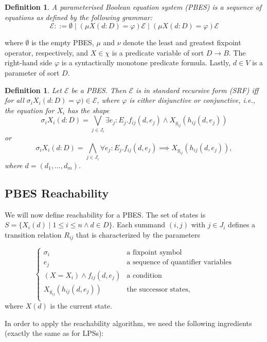 \documentclass{article}
\newtheorem{definition}[theorem]{Definition}
\begin{document}
\begin{definition}
A parameterised Boolean equation system (PBES) is a sequence of equations as defined by the following grammar:
\[
\mathcal{E} ::= \emptyset \mid (\mu X(d:D) = \varphi) \mathcal{E} \mid (\mu X(d:D) = \varphi) \mathcal{E}
\]
\end{definition}
where $\emptyset$ is the empty PBES, $\mu$ and $\nu$ denote the least and greatest fixpoint operator, respectively, and $X \in \chi$ is a predicate
variable of sort $D \rightarrow B$. The right-hand side $\varphi$ is a syntactically monotone predicate formula. Lastly, $d \in V$ is a parameter of
sort $D$.

\begin{definition}
Let $\mathcal{E}$ be a PBES. Then $\mathcal{E}$ is in standard recursive form (SRF) iff for all $\sigma_i X_i(d:D) = \varphi) \in \mathcal{E}$, where
$\varphi$ is either disjunctive or conjunctive, i.e., the equation for $X_i$ has the shape
\[
  \sigma_i X_i(d:D) = \bigvee\limits_{j \in J_i} \exists e_j: E_j . f_{ij}(d,e_j) \land X_{g_{ij}}(h_{ij}(d, e_j))
\]
or
\[
  \sigma_i X_i(d:D) = \bigwedge\limits_{j \in J_i} \forall e_j: E_j . f_{ij}(d,e_j) \implies X_{g_{ij}}(h_{ij}(d, e_j)),
\]
where $d = (d_1, \ldots, d_m)$.
\end{definition}

\subsection{PBES Reachability}
We will now define reachability for a PBES.
The set of states is $S = \{ X_i(d) \mid 1 \leq i \leq n \land d \in D \}$.
Each summand $(i,j)$ with $j \in J_i$ defines a transition relation $R_{ij}$ that is characterized by the parameters

\[
\left\{
\begin{array}{ll}
    \sigma_i & \text{a fixpoint symbol} \\
    e_j & \text{a sequence of quantifier variables} \\
    (X = X_i) \land f_{ij}(d,e_j) & \text{a condition} \\
    X_{g_{ij}}(h_{ij}(d, e_j)) & \text{the successor states,} \\
\end{array}
\right.
\]
where $X(d)$ is the current state.

In order to apply the reachability algorithm, we need the following ingredients (exactly the same as for LPSs):
\end{document}
